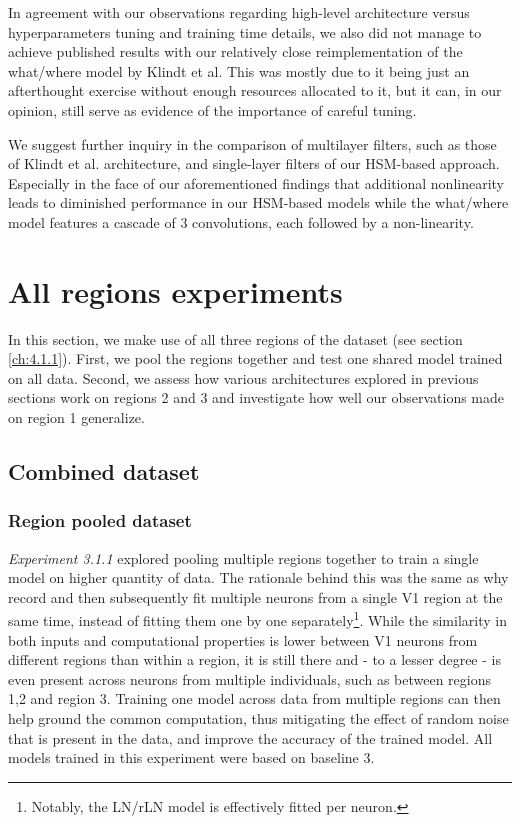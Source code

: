 In agreement with our observations regarding high-level architecture versus hyperparameters tuning and training time details, we also did not manage to achieve published results with our relatively close reimplementation of the what/where model by Klindt et al. This was mostly due to it being just an afterthought exercise without enough resources allocated to it, but it can, in our opinion, still serve as evidence of the importance of careful tuning. 

We suggest further inquiry in the comparison of multilayer filters, such as those of Klindt et al. architecture, and single-layer filters of our HSM-based approach. Especially in the face of our aforementioned findings that additional nonlinearity leads to diminished performance in our HSM-based models while the what/where model features a cascade of 3 convolutions, each followed by a non-linearity. 

\section{All regions experiments}

In this section, we make use of all three regions of the dataset (see section \ref{ch:4.1.1}). First, we pool the regions together and test one shared model trained on all data. Second, we assess how various architectures explored in previous sections work on regions 2 and 3 and investigate how well our observations made on region 1 generalize.

\subsection{Combined dataset}\label{ch:5.3.1}
\subsubsection{Region pooled dataset}

\textit{Experiment 3.1.1} explored pooling multiple regions together to train a single model on higher quantity of data. The rationale behind this was the same as why record and then subsequently fit multiple neurons from a single V1 region at the same time, instead of fitting them one by one separately\footnote{Notably, the LN/rLN model is effectively fitted per neuron.}. While the similarity in both inputs and computational properties is lower between V1 neurons from different regions than within a region, it is still there and - to a lesser degree - is even present across neurons from multiple individuals, such as between regions 1,2 and region 3. Training one model across data from multiple regions can then help ground the common computation, thus mitigating the effect of random noise that is present in the data, and improve the accuracy of the trained model. All models trained in this experiment were based on baseline 3. 

